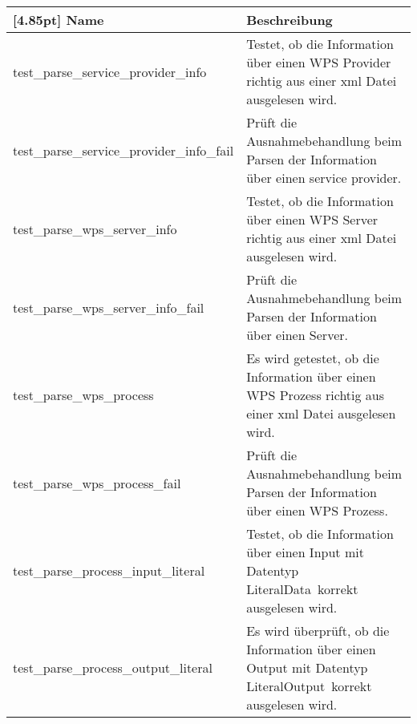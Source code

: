 	\begin{center}
		\renewcommand{\arraystretch}{1.5}
		\setlength\tabcolsep{5pt}
		\begin{tabularx}{\textwidth}{|l|X|}
			\hline
			\rowcolor[gray]{0.75}[4.85pt]
			Name & Beschreibung \\ \hline
			test\_parse\_service\_provider\_info & Testet, ob die Information über einen WPS Provider richtig aus einer xml Datei ausgelesen wird. \\ \hline
			test\_parse\_service\_provider\_info\_fail &  Prüft die Ausnahmebehandlung beim Parsen der Information über einen service provider. \\ \hline
			test\_parse\_wps\_server\_info & Testet, ob die Information über einen WPS Server richtig aus einer xml Datei ausgelesen wird. \\ \hline
			test\_parse\_wps\_server\_info\_fail & Prüft die Ausnahmebehandlung beim Parsen der Information über einen Server. \\ \hline
			test\_parse\_wps\_process & Es wird getestet, ob die Information über einen WPS Prozess richtig aus einer xml Datei ausgelesen wird. \\ \hline
			test\_parse\_wps\_process\_fail & Prüft die Ausnahmebehandlung beim Parsen der Information über einen WPS Prozess. \\ \hline
			test\_parse\_process\_input\_literal & Testet, ob die Information über einen Input mit Datentyp \glqq LiteralData\grqq \ korrekt ausgelesen wird.\\ \hline
			test\_parse\_process\_output\_literal & Es wird überprüft, ob die Information über einen Output mit Datentyp \glqq LiteralOutput\grqq \ korrekt ausgelesen wird. \\ \hline
	\end{tabularx}
	\end{center}	
	
